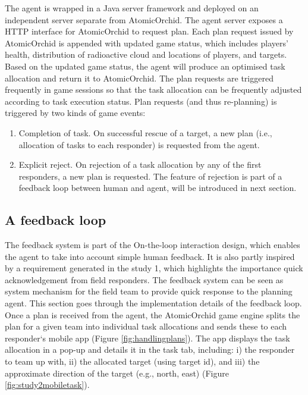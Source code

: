 The agent is wrapped in a Java server framework and deployed on an independent server separate from AtomicOrchid. The agent server exposes a HTTP interface for AtomicOrchid to request plan. Each plan request issued by AtomicOrchid is appended with  updated game status, which includes players' health, distribution of radioactive cloud and locations of players, and targets. Based on the updated game status, the agent will produce an optimised task allocation and return it to AtomicOrchid. The plan requests are triggered frequently in game sessions so that the task allocation can be frequently adjusted according to task execution status. Plan requests (and thus re-planning) is triggered by two kinds of game events:\\


\begin{enumerate}
\item Completion of task. On successful rescue of a target, a new plan (i.e., allocation of tasks to each responder) is requested from the agent.\\

\item Explicit reject. On rejection of a task allocation by any of the first responders, a new plan is requested.  The feature of rejection is part of a feedback loop between human and agent, will be introduced in next section.\\

\end{enumerate}

\subsection{A feedback loop}\label{sec:study2feedback}
The feedback system is part of the On-the-loop interaction design, which enables the agent to take into account simple human feedback. It is also partly inspired by a requirement generated in the study 1, which highlights the importance quick acknowledgement from field responders. The feedback system can be seen as system mechanism for the field team to provide quick response to the planning agent. This section goes through the implementation details of the feedback loop.\\

Once a plan is received from the agent, the AtomicOrchid game engine splits the plan for a given team into individual task allocations and sends these to each responder`s mobile app (Figure \ref{fig:handlingplans}). The app displays the task allocation in a pop-up and details it in the task tab, including: i) the responder to team up with, ii) the allocated target (using target id), and iii) the approximate direction of the target (e.g., north, east) (Figure \ref{fig:study2mobiletask}).\\

